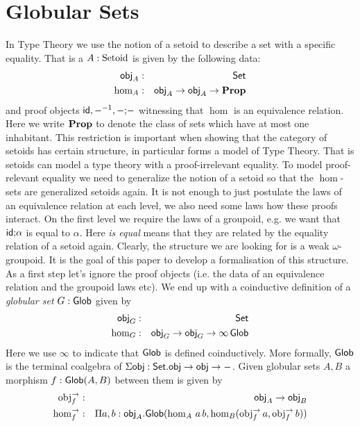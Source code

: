 \section{Globular Sets}
\label{sec:glob}


In Type Theory we use the notion of a setoid to describe a set with a
specific equality. That is a $A : \mathrm{Setoid}$ is given by the
following data:
\begin{eqnarray*}
  \mathsf{obj}_A & : & \mathsf{Set} \\
  \hom_A & : & \mathsf{obj}_A \rightarrow \mathsf{obj}_A \rightarrow \mathbf{Prop}
\end{eqnarray*}
and proof objects $\mathsf{id}, {-}^{-1}, - \text{;} -$ witnessing that $\hom$ is an
equivalence relation. Here we write $\mathbf{Prop}$ to denote the class of sets
which have at most one inhabitant. This restriction is important when
showing that the category of setoids has certain structure, in
particular forms a model of Type Theory. That is setoids can model a
type theory with a proof-irrelevant equality. To model proof-relevant
equality we need to generalize the notion of a setoid so that the
$\hom$-sets are generalized setoids again. It is not enough to just
postulate the laws of an equivalence relation at each level, we also
need some laws how these proofs interact. On the first level we
require the laws of a groupoid, e.g. we want that $\mathsf{id} \text{;} \alpha$ is
equal to $\alpha$. Here \emph{is equal} means that they are related by the
equality relation of a setoid again. Clearly, the structure we are
looking for is a weak $\omega$-groupoid. It is the goal of this paper
to develop a formalisation of this structure. As a first step let's
ignore the proof objects (i.e. the data of an equivalence relation and
the groupoid laws etc).
We end up with a coinductive definition of a \emph{globular set} $G :
\mathsf{Glob}$ given by
\begin{eqnarray*}
  \mathsf{obj}_G & : & \mathsf{Set} \\
  \hom_G & : & \mathsf{obj}_G \rightarrow \mathsf{obj}_G \rightarrow \infty\,\mathsf{Glob}
\end{eqnarray*}
Here we use $\infty$ to indicate that $\mathsf{Glob}$ is defined
coinductively. More formally, $\mathsf{Glob}$ is the terminal coalgebra of
$\Sigma \mathsf{obj} : \mathsf{Set}. \mathsf{obj} \rightarrow \mathsf{obj} \rightarrow -$. Given globular sets
$A,B$ a morphism $f : \mathsf{Glob}(A , B)$ between them is given by 
\begin{eqnarray*}
  \mathrm{obj}^{\rightarrow}_f & : & \mathsf{obj}_A \rightarrow \mathsf{obj}_B \\
  \mathrm{hom}^{\rightarrow}_f & : & \Pi a,b:\mathsf{obj}_A.\mathsf{Glob}(\hom_A\,a\,b,\hom_B(\mathrm{obj}^{\rightarrow}_f\,a,\mathrm{obj}^{\rightarrow}_f\,b))
\end{eqnarray*}
